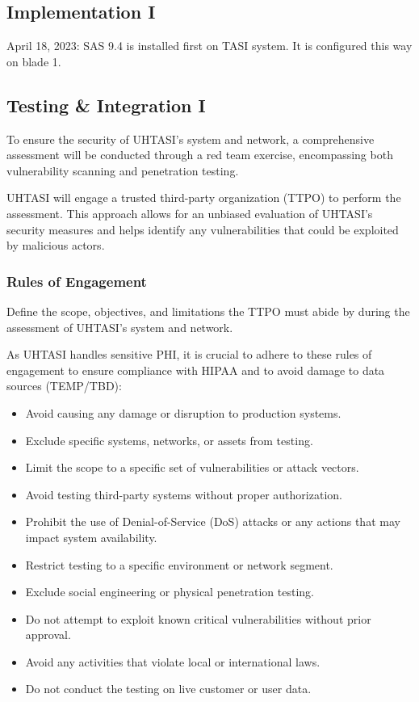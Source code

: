 \subsection{Implementation I}

April 18, 2023:
SAS 9.4 is installed first on TASI system. It is configured this way on blade 1. 


\subsection{Testing \& Integration I}

To ensure the security of UHTASI's system and network, a comprehensive assessment will be conducted through a red team exercise, encompassing both vulnerability scanning and penetration testing. 

UHTASI will engage a trusted third-party organization (TTPO) to perform the assessment. This approach allows for an unbiased evaluation of UHTASI's security measures and helps identify any vulnerabilities that could be exploited by malicious actors.

\subsubsection{Rules of Engagement}
Define the scope, objectives, and limitations the TTPO must abide by during the assessment of UHTASI's system and network. 

As UHTASI handles sensitive PHI, it is crucial to adhere to these rules of engagement to ensure compliance with HIPAA and to avoid damage to data sources (TEMP/TBD):

\begin{itemize}
    \item Avoid causing any damage or disruption to production systems.
    \item Exclude specific systems, networks, or assets from testing.
    \item Limit the scope to a specific set of vulnerabilities or attack vectors.
    \item Avoid testing third-party systems without proper authorization.
    \item Prohibit the use of Denial-of-Service (DoS) attacks or any actions that may impact system availability.
    \item Restrict testing to a specific environment or network segment.
    \item Exclude social engineering or physical penetration testing.
    \item Do not attempt to exploit known critical vulnerabilities without prior approval.
    \item Avoid any activities that violate local or international laws.
    \item Do not conduct the testing on live customer or user data.
\end{itemize}


